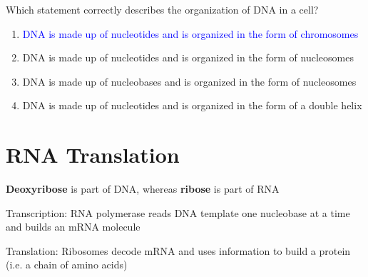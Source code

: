\documentclass[11pt,fleqn]{book}
\begin{document}
\begin{exercise}
    Which statement correctly describes the organization of DNA in a cell?
    \begin{enumerate}
        \item \textcolor{blue}{DNA is made up of nucleotides and is organized in the form of chromosomes}
        \item DNA is made up of nucleotides and is organized in the form of nucleosomes
        \item DNA is made up of nucleobases and is organized in the form of nucleosomes
        \item DNA is made up of nucleotides and is organized in the form of a double helix
    \end{enumerate}
\end{exercise}

\section{RNA Translation}
\textbf{Deoxyribose} is part of DNA, whereas \textbf{ribose} is part of RNA
\begin{descriptions}
    \item[Transcription:] RNA polymerase reads DNA template one nucleobase at a time and builds an mRNA molecule
    \item[Translation:] Ribosomes decode mRNA and uses information to build a protein (i.e. a chain of amino acids)
\end{descriptions}
\end{document}

